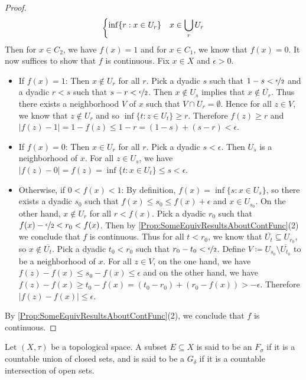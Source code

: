 \documentclass[screen]{techreport}
\numberwithin{equation}{section}
\begin{document}
\begin{proof}
\[\begin{dcases}
 		\inf \{r : x \in U_r\} & x \in \bigcup_r U_r
	\end{dcases}
	\]
	Then for $x \in C_2$, we have $f(x) = 1$ and for $x \in C_1$, we know that $f(x) = 0$.
	It now suffices to show that $f$ is continuous.
	Fix $x \in X$ and $\epsilon > 0$.
	\begin{itemize}
		\item If $f(x) = 1$: Then $x \not\in U_r$ for all $r$.
		Pick a dyadic $s$ such that $1 - s < \nicefrac{\epsilon}{2}$ and a dyadic $r < s$ such that $s - r < \nicefrac{\epsilon}{2}$.
		Then $x \not\in U_s$ implies that $x \not\in \overline{U_r}$.
		Thus there exists a neighborhood $V$ of $x$ such that $V \cap U_r = \emptyset$.
		Hence for all $z \in V$, we know that $z \not\in U_r$ and so $\inf\{t : z \in U_t\} \ge r$.
		Therefore $f(z) \ge r$ and $|f(z) - 1| = 1 - f(z) \le 1 - r = (1-s) + (s-r) < \epsilon$.
		
		\item If $f(x) = 0$: Then $x \in U_r$ for all $r$.
		Pick a dyadic $s < \epsilon$. Then $U_s$ is a neighborhood of $x$.
		For all $z \in U_s$, we have $|f(z) - 0| = f(z) = \inf\{ t : x \in U_t\} \le s < \epsilon$.
		
		\item Otherwise, if $0 < f(x) < 1$:
		By definition, $f(x) = \inf\{ s : x \in U_s\}$, so there exists a dyadic $s_0$ such that $f(x) \le s_0 \le f(x) + \epsilon$ and $x \in U_{s_0}$.
		On the other hand, $x \not\in U_r$ for all $r < f(x)$.
		Pick a dyadic $r_0$ such that $f(x) - \nicefrac{\epsilon}{2} < r_0 < f(x)$.
		Then by \cref{Prop:SomeEquivResultsAboutContFunc}(2) we conclude that $f$ is continuous.
		Thus for all $t < r_0$, we know that $\overline{U_t} \subseteq U_{r_0}$, so $x \not\in \overline{U_t}$.
		Pick a dyadic $t_0 < r_0$ such that $r_0 - t_0 < \nicefrac{\epsilon}{2}$.
		Define $V \coloneqq U_{s_0} \setminus \overline{U_{t_0}}$ to be a neighborhood of $x$.
		For all $z \in V$, on the one hand, we have $f(z) - f(x) \le s_0 - f(x) \le \epsilon$ and on the other hand, we have $f(z) - f(x) \ge t_0 - f(x) = (t_0 - r_0) + (r_0 - f(x)) > -\epsilon$.
		Therefore $|f(z) - f(x)| \le \epsilon$.
	\end{itemize}
	By \cref{Prop:SomeEquivResultsAboutContFunc}(2), we conclude that $f$ is continuous.
\end{proof}

\begin{definition}\label{De:FsigmaGdelta}
	Let $(X,\tau)$ be a topological space.
	A subset $E \subseteq X$ is said to be an $F_\sigma$ if it is a countable union of closed sets, and is said to be a $G_\delta$ if it is a countable intersection of open sets.
\end{definition}
\end{document}
